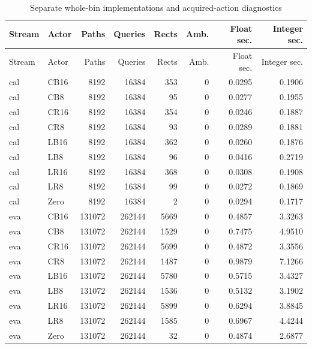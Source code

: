 {\small\setlength{\tabcolsep}{3pt}
\begin{longtable}{llrrrrrr}
\caption{Separate whole-bin implementations and acquired-action diagnostics}\label{tab:kernels86}\\
\hline
Stream & Actor & Paths & Queries & Rects & Amb. & Float sec. & Integer sec. \\
\hline\endfirsthead
Stream & Actor & Paths & Queries & Rects & Amb. & Float sec. & Integer sec. \\
\hline\endhead
cal & CB16 & 8192 & 16384 & 353 & 0 & 0.0295 & 0.1906 \\
cal & CB8 & 8192 & 16384 & 95 & 0 & 0.0277 & 0.1955 \\
cal & CR16 & 8192 & 16384 & 354 & 0 & 0.0246 & 0.1887 \\
cal & CR8 & 8192 & 16384 & 93 & 0 & 0.0289 & 0.1881 \\
cal & LB16 & 8192 & 16384 & 362 & 0 & 0.0260 & 0.1876 \\
cal & LB8 & 8192 & 16384 & 96 & 0 & 0.0416 & 0.2719 \\
cal & LR16 & 8192 & 16384 & 368 & 0 & 0.0308 & 0.1908 \\
cal & LR8 & 8192 & 16384 & 99 & 0 & 0.0272 & 0.1869 \\
cal & Zero & 8192 & 16384 & 2 & 0 & 0.0294 & 0.1717 \\
eva & CB16 & 131072 & 262144 & 5669 & 0 & 0.4857 & 3.3263 \\
eva & CB8 & 131072 & 262144 & 1529 & 0 & 0.7475 & 4.9510 \\
eva & CR16 & 131072 & 262144 & 5699 & 0 & 0.4872 & 3.3556 \\
eva & CR8 & 131072 & 262144 & 1487 & 0 & 0.9879 & 7.1266 \\
eva & LB16 & 131072 & 262144 & 5780 & 0 & 0.5715 & 3.4327 \\
eva & LB8 & 131072 & 262144 & 1536 & 0 & 0.5132 & 3.1902 \\
eva & LR16 & 131072 & 262144 & 5899 & 0 & 0.6294 & 3.8845 \\
eva & LR8 & 131072 & 262144 & 1585 & 0 & 0.6967 & 4.4244 \\
eva & Zero & 131072 & 262144 & 32 & 0 & 0.4874 & 2.6877 \\
\hline\end{longtable}}
